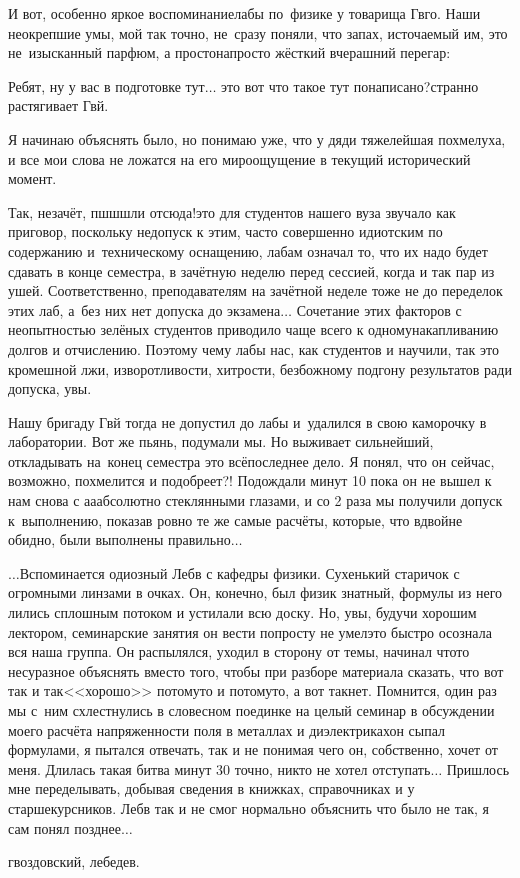 И вот, особенно яркое воспоминание\mdash лабы по~физике у товарища Гв\sdash го. Наши неокрепшие умы, мой так точно, не~сразу поняли, что запах, источаемый им, это не~изысканный парфюм, а просто\sdash напросто жёсткий вчерашний перегар:

\diagdash Ребят, ну у вас в подготовке тут$\ldots$ это вот что такое тут понаписано?\mdash странно растягивает Гв\sdash й.

Я начинаю объяснять было, но понимаю уже, что у дяди тяжелейшая похмелуха, и все мои слова не ложатся на его мироощущение в текущий исторический момент.

\diagdash Так, незачёт, пш\sdash ш\sdash шли отсюда!\mdash это для студентов нашего вуза звучало как приговор, поскольку недопуск к этим, часто совершенно идиотским по содержанию и~техническому оснащению, лабам означал то, что их надо будет сдавать в конце семестра, в зачётную неделю перед сессией, когда и так пар из ушей. Соответственно, преподавателям на зачётной неделе тоже не до переделок этих лаб, а~без них нет допуска до экзамена$\ldots$ Сочетание этих факторов с неопытностью зелёных студентов приводило чаще всего к одному\mdash накапливанию долгов и отчислению. Поэтому чему лабы нас, как студентов и научили, так это кромешной лжи, изворотливости, хитрости, безбожному подгону результатов ради допуска, увы.

Нашу бригаду Гв\sdash й тогда не допустил до лабы и~удалился в свою каморочку в лаборатории. Вот же пьянь, подумали мы. Но выживает сильнейший, откладывать на~конец семестра это всё\mdash последнее дело. Я понял, что он сейчас, возможно, похмелится и подобреет?! Подождали минут 10 пока он не вышел к нам снова с а\sdash а\sdash абсолютно стеклянными глазами, и со 2 раза мы получили допуск к~выполнению, показав ровно те же самые расчёты, которые, что вдвойне обидно, были выполнены правильно$\ldots$

$\ldots$Вспоминается одиозный Леб\sdash в с кафедры физики. Сухенький старичок с огромными линзами в очках. Он, конечно, был физик знатный, формулы из него лились сплошным потоком и устилали всю доску. Но, увы, будучи хорошим лектором, семинарские занятия он вести попросту не умел\mdash это быстро осознала вся наша группа. Он распылялся, уходил в сторону от темы, начинал что\sdash то несуразное объяснять вместо того, чтобы при разборе материала сказать, что вот так и так\mdash <<хорошо>> потому\sdash то и потому\sdash то, а вот так\mdash нет. Помнится, один раз мы с~ним схлестнулись в словесном поединке на целый семинар в обсуждении моего расчёта напряженности поля в металлах и диэлектриках\mdash он сыпал формулами, я пытался отвечать, так и не понимая чего он, собственно, хочет от меня. Длилась такая битва минут 30 точно, никто не хотел отступать$\ldots$ Пришлось мне переделывать, добывая сведения в книжках, справочниках и у старшекурсников. Леб\sdash в так и не смог нормально объяснить что было не так, я сам понял позднее$\ldots$





гвоздовский, лебедев.


\begin{center}
\end{center}